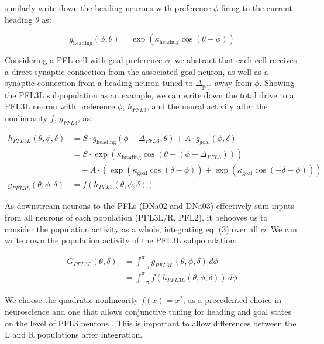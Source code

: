 \documentclass[11pt]{article}
\begin{document}
similarly write down the heading neurons with preference $\phi$ firing to the current heading $\theta$ as:

\begin{equation}
g_{\text{heading}}(\phi, \theta) = \exp(\kappa_{\text{heading}} \cos(\theta - \phi))
\end{equation}

Considering a PFL cell with goal preference $\phi$, we abstract that each cell receives a direct synaptic connection from the associated goal neuron, as well as a synaptic connection from a heading neuron tuned to $\Delta_{\text{pop}}$ away from $\phi$. Showing the PFL3L subpopulation as an example, we can write down the total drive to a PFL3L neuron with preference $\phi$, $h_{PFL3}$, and the neural activity after the nonlinearity $f$, $g_{PFL3}$, as:

\begin{equation}
\begin{aligned}
h_{PFL3L}(\theta, \phi, \delta) &= S \cdot g_{\text{heading}}(\phi - \Delta_{PFL3}, \theta) + A \cdot g_{\text{goal}}(\phi, \delta) \\
&= S \cdot \exp(\kappa_{\text{heading}} \cos(\theta - (\phi - \Delta_{PFL3}))) \\
&\quad + A \cdot (\exp(\kappa_{\text{goal}} \cos(\delta - \phi)) + \exp(\kappa_{\text{goal}} \cos(-\delta - \phi))) \\
g_{PFL3L}(\theta, \phi, \delta) &= f(h_{PFL3}(\theta, \phi, \delta))
\end{aligned}
\end{equation}

As downstream neurons to the PFLs (DNa02 and DNa03) effectively sum inputs from all neurons of each population (PFL3L/R, PFL2), it behooves us to consider the population activity as a whole, integrating eq. (3) over all $\phi$. We can write down the population activity of the PFL3L subpopulation:

\begin{equation}
\begin{aligned}
G_{PFL3L}(\theta, \delta) &= \int_{-\pi}^{\pi} g_{PFL3L}(\theta, \phi, \delta)\, d\phi \\
&= \int_{-\pi}^{\pi} f(h_{PFL3L}(\theta, \phi, \delta))\, d\phi
\end{aligned}
\end{equation}

We choose the quadratic nonlinearity $f(x) = x^2$, as a precedented choice in neuroscience and one that allows conjunctive tuning for heading and goal states on the level of PFL3 neurons \cite{hennequin2018}. This is important to allow differences between the L and R populations after integration.
\end{document}
